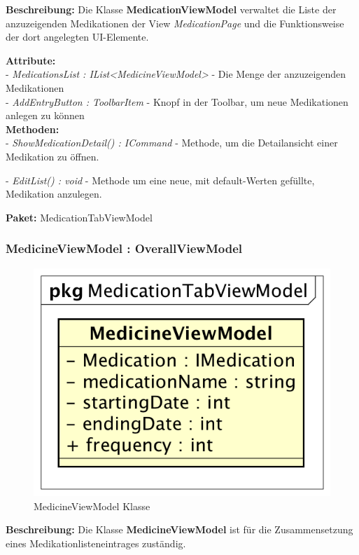\documentclass[a4paper]{scrreprt}
\begin{document}
\textbf{Beschreibung:} Die Klasse \textbf{MedicationViewModel} verwaltet die Liste der anzuzeigenden Medikationen der View \textit{MedicationPage} und die Funktionsweise der dort angelegten UI-Elemente.

\textbf{Attribute:}\\
- \textit{MedicationsList : IList<MedicineViewModel>} - Die Menge der anzuzeigenden Medikationen\\
- \textit{AddEntryButton : ToolbarItem} - Knopf in der Toolbar, um neue Medikationen anlegen zu können\\

\textbf{Methoden:}\\
- \textit{ShowMedicationDetail() : ICommand} - Methode, um die Detailansicht einer Medikation zu öffnen.

- \textit{EditList() : void} - Methode um eine neue, mit default-Werten gefüllte, Medikation anzulegen.

\textbf{Paket:} MedicationTabViewModel

\subsubsection{MedicineViewModel : OverallViewModel}
\begin{figure}[H]
\centering
\includegraphics[width=0.45\textheight]{graphics/Klassendiagramme/ViewModel/MedicineViewModel.png}
\caption{MedicineViewModel Klasse}
\end{figure}

\textbf{Beschreibung:} Die Klasse \textbf{MedicineViewModel} ist für die Zusammensetzung eines Medikationlisteneintrages zuständig.
\end{document}
